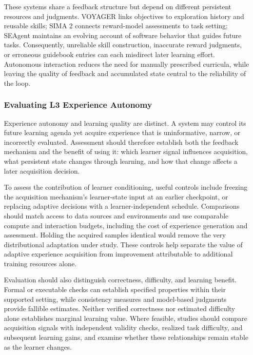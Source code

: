 These systems share a feedback structure but depend on different persistent
resources and judgments.
VOYAGER links objectives to exploration history and reusable skills;
SIMA 2 connects reward-model assessments to task setting; SEAgent maintains
an evolving account of software behavior that guides future tasks.
Consequently, unreliable skill construction, inaccurate reward judgments,
or erroneous guidebook entries can each misdirect later learning effort.
Autonomous interaction reduces the need for manually prescribed curricula,
while leaving the quality of feedback and accumulated state central to the
reliability of the loop.

\subsubsection{Evaluating L3 Experience Autonomy}

Experience autonomy and learning quality are distinct.
A system may control its future learning agenda yet acquire experience
that is uninformative, narrow, or incorrectly evaluated.
Assessment should therefore establish both the feedback mechanism and the
benefit of using it: which learner signal influences acquisition, what
persistent state changes through learning, and how that change affects a
later acquisition decision.

To assess the contribution of learner conditioning, useful controls include
freezing the acquisition mechanism's learner-state input at an earlier
checkpoint, or replacing adaptive decisions with a learner-independent
schedule.
Comparisons should match access to data sources and environments and use
comparable compute and interaction budgets, including the cost of experience
generation and assessment.
Holding the acquired samples identical would remove the very distributional
adaptation under study.
These controls help separate the value of adaptive experience acquisition
from improvement attributable to additional training resources alone.

Evaluation should also distinguish correctness, difficulty, and learning
benefit.
Formal or executable checks can establish specified properties within their
supported setting, while consistency measures and model-based judgments
provide fallible estimates.
Neither verified correctness nor estimated difficulty alone establishes
marginal learning value.
Where feasible, studies should compare acquisition signals with independent
validity checks, realized task difficulty, and subsequent learning gains,
and examine whether these relationships remain stable as the learner changes.

